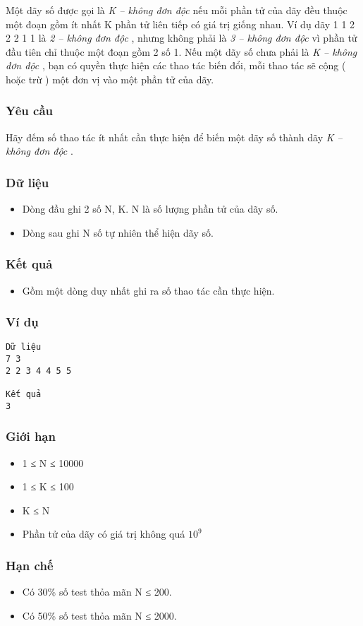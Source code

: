 



   Một dãy số được gọi là   \textit{    K – không đơn độc   }   nếu mỗi phần tử của dãy đều thuộc một đoạn gồm ít nhất       K      phần tử liên tiếp có giá trị giống nhau. Ví dụ dãy 1 1 2 2 2 1 1 là   \textit{    2 – không đơn độc   }   , nhưng không phải là   \textit{    3 – không đơn độc   }   vì phần tử đầu tiên chỉ thuộc một đoạn gồm 2 số 1. Nếu một dãy số chưa phải là   \textit{    K – không đơn độc   }   , bạn có quyền thực hiện các thao tác biến đổi, mỗi thao tác sẽ cộng ( hoặc trừ ) một đơn vị vào một phần tử của dãy.  

\subsubsection{   Yêu cầu  }

   Hãy đếm số thao tác ít nhất cần thực hiện để biến một dãy số thành dãy   \textit{    K – không đơn độc   }   .  

\subsubsection{   Dữ liệu  }
\begin{itemize}
	\item     Dòng đầu ghi 2 số N, K. N là số lượng phần tử của dãy số.   
	\item     Dòng sau ghi N số tự nhiên thể hiện dãy số.   
\end{itemize}

\subsubsection{   Kết quả  }
\begin{itemize}
	\item     Gồm một dòng duy nhất ghi ra số thao tác cần thực hiện.   
\end{itemize}

\subsubsection{   Ví dụ  }
\begin{verbatim}
Dữ liệu
7 3
2 2 3 4 4 5 5

Kết quả
3
\end{verbatim}

\subsubsection{   Giới hạn  }
\begin{itemize}
	\item     1 ≤ N ≤ 10000   
	\item     1 ≤ K ≤ 100   
	\item     K ≤ N   
	\item     Phần tử của dãy có giá trị không quá $10^{9}$
\end{itemize}

\subsubsection{   Hạn chế  }
\begin{itemize}
	\item     Có 30\% số test thỏa mãn N ≤ 200.   
	\item     Có 50\% số test thỏa mãn N ≤ 2000.   
\end{itemize}
